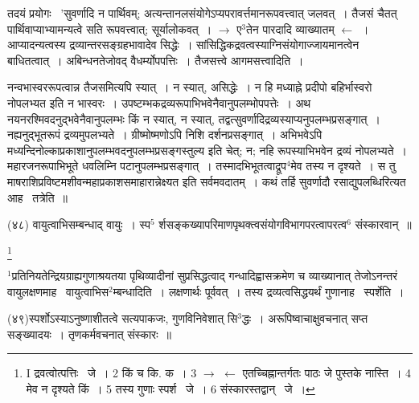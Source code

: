 \documentclass[11pt, openany]{book}
\newcommand\blfootnote[1]{%
 \begingroup
 \renewcommand\thefootnote{}\footnote{#1}%
 \addtocounter{footnote}{-1}%
 \endgroup
}
\begin{document}
तदयं प्रयोगः \textendash\ 'सुवर्णादि न पार्थिवम्; अत्यन्तानलसंयोगेऽप्यपरावर्त्तमानरूपवत्त्वात् जलवत्~। तैजसं चैतत् पार्थिवाप्याभ्यामन्यत्वे सति रूपवत्त्वात्; सूर्यालोकवत्~। $\rightarrow$ ए$^3$तेन पारदादि व्याख्यातम् $\leftarrow$~। आप्यादन्यत्वस्य द्रव्यान्तरसङ्ग्रहभावादेव सिद्धेः~। सांसिद्धिकद्रवत्वस्याग्निसंयोगाज्जायमानत्वेन बाधितत्वात्~। अबिन्धनतेजोवद् वैधर्म्योपपत्तिः~। तैजसत्त्वे आगमसत्त्वादिति~।

नन्वभास्वररूपत्वान्न तैजसमित्यपि स्यात्~। न स्यात्, असिद्धेः~। न हि मध्याह्ने प्रदीपो बहिर्भास्वरो नोपलभ्यत इति न भास्वरः~। उपष्टम्भकद्रव्यरूपाभिभवेनैवानुपलम्भोपपत्तेः~। अथ नयनरश्मिवदनुद्भवेनैवानुपलम्भः किं न स्यात्, न स्यात्, तद्वत्सुवर्णादिद्रव्यस्याप्यनुपलम्भप्रसङ्गात्~। नह्यनुद्भूतरूपं द्रव्यमुपलभ्यते~। ग्रीष्मोष्मणोऽपि निशि दर्शनप्रसङ्गात्~। अभिभवेऽपि मध्यन्दिनोल्काप्रकाशानुपलम्भवदनुपलम्भप्रसङ्गस्तुल्य इति चेत्; न; नहि रूपस्याभिभवेन द्रव्यं नोपलभ्यते~। महारजनरूपाभिभूते धवलिम्नि पटानुपलम्भप्रसङ्गात्~। तस्मादभिभूतत्वाद्रूप$^4$मेव तस्य न दृश्यते~। स तु माषराशिप्रविष्टमशीवन्महाप्रकाशसमाहारान्नेक्ष्यत इति सर्वमवदातम्~। कथं तर्हि सुवर्णादौ रसाद्युपलब्धिरित्यत आह \textendash\ तत्रेति~॥

\begin{sloppypar}
\hangindent=2cm {\knu (४८) वायुत्वाभिसम्बन्धाद् वायुः~। स्प$^5$ र्शसङ्कख्यापरिमाणपृथक्त्वसंयोगविभागपरत्वापरत्व$^6$ संस्कारवान्~॥}
\end{sloppypar}

\blfootnote{I द्रवत्वोत्पत्तिः \textendash\ जे~। 2 किं च कि. क~। 3 $\rightarrow$ $\leftarrow$ एतच्चिह्नान्तर्गतः पाठः जे पुस्तके नास्ति~। 4 मेव न दृश्यते किं~। 5 तस्य गुणाः स्पर्श \textendash\ जे~। 6 संस्कारस्तद्वान् \textendash\ जे~।}

\newpage
${}^1$प्रतिनियतेन्द्रियग्राह्यगुणाश्रयतया पृथिव्यादीनां सुप्रसिद्धत्वाद् गन्धादिह्वासक्रमेण च व्याख्यानात् तेजोऽनन्तरं वायुलक्षणमाह \textendash\ {\knu वायुत्वाभिस$^2$म्बन्धादिति}~। लक्षणार्थः पूर्ववत्~। तस्य द्रव्यत्वसिद्धयर्थं गुणानाह \textendash\ {\knu स्पर्शेति}~।

\hangindent=2cm {\knu (४९)स्पर्शोऽस्याऽनुष्णाशीतत्वे सत्यपाकजः, गुणविनिवेशात् सि$^3$द्धः~। अरूपिष्वाचाक्षुवचनात् सप्त सङ्ख्यादयः~। तृणकर्मवचनात् संस्कारः~॥}
\end{document}
